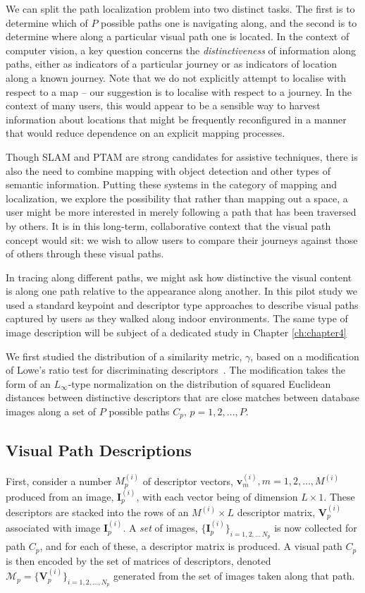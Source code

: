We can split the path localization problem into two distinct tasks.  The first is to determine which of $P$ possible paths one is navigating along, and the second is to determine where along a particular visual path one is located.  In the context of computer vision, a key question concerns the {\it distinctiveness} of information along paths, either as indicators of a particular journey or as indicators of location along a known journey.  Note that we do not explicitly attempt to localise with respect to a map -- our suggestion is to localise with respect to a journey.  In the context of many users, this would appear to be a sensible way to harvest information about locations that might be frequently reconfigured in a manner that would reduce dependence on an explicit mapping processes.

Though SLAM and PTAM are strong candidates for assistive techniques, there is also the need to combine mapping with object detection and other types of semantic information.  Putting these systems in the category of mapping and localization, we explore the possibility that rather than mapping out a space, a user might be more interested in merely following a path that has been traversed by others.  It is in this long-term, collaborative context that the visual path concept would sit: we wish to allow users to compare their journeys against those of others through these visual paths.

In tracing along different paths, we might ask how distinctive the visual content is along one path relative to the appearance along another. In this pilot study we used a standard keypoint and descriptor type approaches to describe visual paths captured by users as they walked along indoor environments. The same type of image description will be subject of a dedicated study in Chapter \ref{ch:chapter4}

We first studied the distribution of a similarity metric, $\gamma$, based on a modification of Lowe's ratio test for discriminating descriptors~\cite{Lowe2004}. The modification takes the form of an $L_{\infty}$-type normalization on the distribution of squared Euclidean distances between distinctive descriptors that are close matches between database images along a set of $P$ possible paths $C_p,\,p=1,2,\ldots, P$.

\subsection{Visual Path Descriptions} First, consider a number $M_p^{(i)}$ of descriptor vectors, $\mathbf{v}_m^{(i)}, m=1,2,\ldots,M^{(i)}$ produced from an image, $\mathbf{I}^{(i)}_p$, with each vector being of  dimension $L \times 1$.  These descriptors are stacked into the rows of an $M^{(i)}\times L$ descriptor matrix, $\mathbf{V}^{(i)}_p$ associated with image $\mathbf{I}^{(i)}_p$.  A {\it set} of images, $\lbrace \mathbf{I}^{(i)}_p\rbrace_{i=1,2,\ldots\,N_p}$ is now collected for path $C_p$, and for each of these, a descriptor matrix is produced.  A visual path $C_p$ is then encoded by the set of matrices of descriptors, denoted $\mathcal{M}_p=\lbrace \mathbf{V}^{(i)}_p \rbrace_{i=1,2,\ldots,N_p}$ generated from the set of images taken along that path.
 
